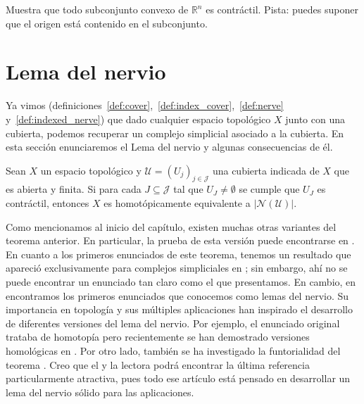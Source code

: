 \documentclass{standalone}
\begin{document}
	\begin{exercise}\label{ex:convex_is_contractible}
		Muestra que todo subconjunto convexo de $\mathbb{R}^{n}$ es contráctil. Pista: puedes suponer que el origen está contenido en el subconjunto.
	\end{exercise}
	
	\section{Lema del nervio}
	
	Ya vimos (definiciones~\ref{def:cover},~\ref{def:index_cover},~\ref{def:nerve} y~\ref{def:indexed_nerve}) que dado cualquier espacio topológico $X$ junto con una cubierta, podemos recuperar un complejo simplicial asociado a la cubierta. En esta sección enunciaremos el Lema del nervio y algunas consecuencias de él.
	
	\begin{theorem}\label{thm:nerve}
		Sean $X$ un espacio topológico y $\mathcal{U} = (U_{j})_{j\in\mathcal{J}}$ una cubierta indicada de $X$ que es abierta y finita. Si para cada $J\subseteq\mathcal{J}$ tal que $U_{J}\neq\emptyset$ se cumple que $U_{J}$ es contráctil, entonces $X$ es homotópicamente equivalente a $|\mathcal{N}(\mathcal{U})|$.
	\end{theorem}
	
	Como mencionamos al inicio del capítulo, existen muchas otras variantes del teorema anterior. En particular, la prueba de esta versión puede encontrarse en \cite[Capítulo 15]{kozlov:2008:combinatorial:alg:topo}. En cuanto a los primeros enunciados de este teorema, tenemos un resultado que apareció exclusivamente para complejos simpliciales en \cite{Borsuk1948}; sin embargo, ahí no se puede encontrar un enunciado tan claro como el que presentamos. En cambio, en  \cite{Weil1952, Mccord:nerve} encontramos los primeros enunciados que conocemos como lemas del nervio. Su importancia en topología y sus múltiples aplicaciones han inspirado el desarrollo de diferentes versiones del lema del nervio. Por ejemplo, el enunciado original trataba de homotopía pero recientemente se han demostrado versiones homológicas en \cite{homological:nerve, MESHULAM:nerve}. Por otro lado, también se ha investigado la funtorialidad del teorema \cite{BAUER:nerve}. Creo que el y la lectora podrá encontrar la última referencia particularmente atractiva, pues todo ese artículo está pensado en desarrollar un lema del nervio sólido para las aplicaciones.
	
\end{document}
